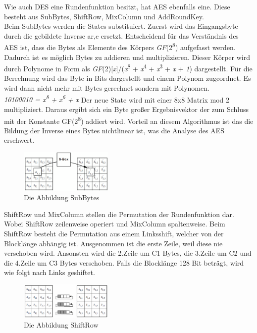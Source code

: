 \documentclass[11pt]{scrartcl}
\begin{document}
\noindent
Wie auch DES eine Rundenfunktion besitzt, hat AES ebenfalls eine. Diese besteht aus SubBytes, ShiftRow, MixColumn und AddRoundKey.\\
Beim SubBytes werden die States substituiert. Zuerst wird das Eingangsbyte durch die gebildete Inverse a{\tiny r,c} ersetzt.
\grqq{}Entscheidend für das Verständnis des AES ist, dass die Bytes als Elemente des Körpers \textit{GF}(2\textsuperscript{8}) aufgefasst werden.\grqq{}\citep{2} Dadurch ist es möglich Bytes zu addieren und multiplizieren. Dieser Körper wird durch Polynome in Form als \textit{GF}(2)[\textit{x}]/(\textit{x}\textsuperscript{8} + \textit{x}\textsuperscript{4} + \textit{x}\textsuperscript{3} + \textit{x} + \textit{1}) dargestellt. Für die Berechnung wird das Byte in Bits dargestellt und einem Polynom zugeordnet. Es wird dann nicht mehr mit Bytes gerechnet sondern mit Polynomen.\\
\textit{{10100010} = x\textsuperscript{8} + x\textsuperscript{6} + x}
Der neue State wird mit einer 8x8 Matrix mod 2 multipliziert. Daraus ergibt sich ein Byte großer Ergebnisvektor der zum Schluss mit der Konstante GF(2\textsuperscript{8}) addiert wird. Vorteil an diesem Algorithmus ist das die Bildung der Inverse eines Bytes nichtlinear ist, was die Analyse des AES erschwert.\cite{2}\cite{3}\\
\begin{figure}[H]
\includegraphics[width=0.40\textwidth]{Bilder/AES/AES_SubBytes}
	\caption{Die Abbildung SubBytes \citep{2}}
	\label{fig8}
\end{figure}
\noindent
ShiftRow und MixColumn stellen die Permutation der Rundenfunktion dar. Wobei ShiftRow zeilenweise operiert und MixColumn spaltenweise. Beim ShiftRow besteht die Permutation aus einem Linksshift, welcher von der Blocklänge abhängig ist. Ausgenommen ist die erste Zeile, weil diese nie verschoben wird. Ansonsten wird die 2.Zeile um C1 Bytes, die 3.Zeile um C2 und die 4.Zeile um C3 Bytes verschoben. Falls die Blocklänge 128 Bit beträgt, wird wie folgt nach Links geshiftet.\cite{2}
\begin{figure}[H]
\includegraphics[width=0.40\textwidth]{Bilder/AES/AES_ShiftRow}
	\caption{Die Abbildung ShiftRow \citep{2}}
	\label{fig9}
\end{figure}
\end{document}
